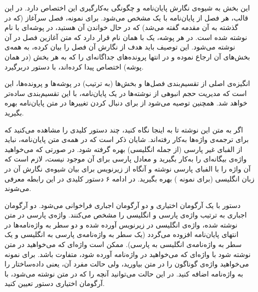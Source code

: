 
این بخش به شیوه‌ی نگارش پایان‌نامه و چگونگی به‌کارگیری این  اختصاص دارد.
در این قالب، هر فصل از پایان‌نامه با یک  مشخص می‌شود. برای نمونه، فصل سرآغاز (که در گذشته به آن مقدمه گفته می‌شد) که در حال خواندن آن هستید، در پوشه‌ای با نام  نوشته شده است. در هر پوشه، یک  با همان نام قرار دارد که متن آغازین فصل در آن نوشته می‌شود. این توصیف باید هدف از نگارش آن فصل را بیان کرده، به همه‌ی بخش‌های آن ارجاع نموده و در انتها پرونده‌های جداگانه‌ای را که به هر بخش (در همان پوشه) اختصاص پیدا کرده‌اند، با دستور  دربرگیرد.

انگیزه‌ی اصلی از تقسیم‌بندی فصل‌ها و بخش‌ها (به ترتیب) در پوشه‌ها و پرونده‌ها، این است که مدیریت حجم انبوهی از نوشته‌ها در یک پایان‌نامه، با این تقسیم‌بندی ساده‌تر خواهد شد. همچنین توصیه می‌شود از   برای دنبال کردن تغییرها در متن پایان‌نامه بهره بگیرید.

اگر به متن  این نوشته تا به اینجا نگاه کنید، چند دستور کلیدی را مشاهده می‌کنید که برای ترجمه‌ی واژه‌ها به‌کار رفته‌اند. شایان ذکر است که در همه‌ی متن پایان‌نامه، نباید از الفبای غیر پارسی (از جمله انگلیسی) بهره گرفته شود. در صورتی که می‌خواهید واژه‌ی بیگانه‌ای را به‌کار بگیرید و معادل پارسی برای آن موجود نیست، لازم است که آن واژه را با الفبای پارسی نوشته و آنگاه از زیرنویس برای بیان شیوه‌ی نگارش آن در زبان انگلیسی (برای نمونه ) بهره  بگیرید. در ادامه ۶ دستور کلیدی در این رابطه معرفی می‌شوند.

	 دستور  با یک آرگومان اختیاری و دو آرگومان اجباری فراخوانی می‌شود. دو آرگومان اجباری به ترتیب واژه‌ی پارسی و انگلیسی را مشخص می‌کنند. واژه‌ی پارسی در متن نوشته شده، واژه‌ی انگلیسی در زیرنویس آورده شده و دو سطر به واژه‌نامه‌ها در انتهای پایان‌نامه افزوده می‌گردد (یک سطر به واژه‌نامه‌ی پارسی به انگلیسی و یک سطر به واژه‌نامه‌ی انگلیسی به پارسی). ممکن است واژه‌ای که می‌خواهید در متن نوشته شود با واژه‌ای که می‌خواهید در واژه‌نامه آورده شود، متفاوت باشد. برای نمونه می‌خواهید واژه‌ی  گوناگون را در متن بیاورید، ولی حالت مفرد آن، یعنی داده‌ساختار را به واژه‌نامه اضافه کنید. در این حالت می‌توانید آنچه را که در متن نوشته می‌شود، با آرگومان اختیاری دستور  تعیین کنید.
	
